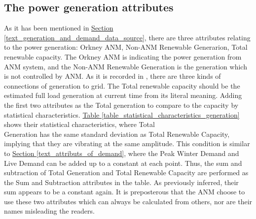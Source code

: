 \documentclass[12pt,a4paper]{report}
\begin{document}
                \subsection{The power generation attributes}
                As it has been mentioned in \hyperref[text_generation_and_demand_data_source]{Section \ref*{text_generation_and_demand_data_source}}, there are three attributes relating to the power generation: Orkney ANM, Non-ANM Renewable Generarion, Total renewable capacity. The Orkney ANM is indicating the power generation from ANM system, and the Non-ANM Renewable Generation is the generation which is not controlled by ANM. As it is recorded in \cite{report:OrkneyAudit}, there are three kinds of \\connections of generation to grid. The Total renewable capacity should be the estimated full load generation at current time from its literal meaning. Adding the first two attributes as the Total generation to compare to the capacity by statistical characteristics. \hyperref[table_statistical_characteristics_generation]{Table \ref*{table_statistical_characteristics_generation}} shows their statistical characteristics, where Total \\Generation has the same standard deviation as Total Renewable Capacity, implying that they are vibrating at the same amplitude. This condition is similar to \hyperref[text_attributs_of_demand]{Section \ref*{text_attributs_of_demand}}, where the Peak Winter Demand and Live Demand can be added up to a constant at each point. Thus, the sum and subtraction of Total Generation and Total Renewable Capacity are performed as the Sum and Subtraction attributes in the table. As previously inferred, their sum appears to be a constant again. It is preposterous that the ANM choose to use these two attributes which can always be calculated from others, nor are their names misleading the readers.
\end{document}

